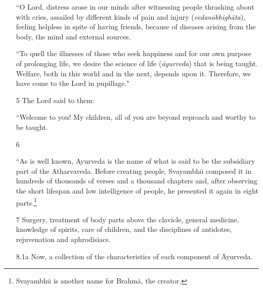 \documentclass[12pt]{article}
\newcommand{\saneng}[2]{#2 (\emph{#1})}
\newcommand{\ssaneng}[2]{\relax }
\begin{document}
\begin{itemize}
“O Lord, distress arose in our minds after witnessing people thrashing about with
cries, assailed by different kinds of \saneng{vedanābhighāta}{pain and injury}, 
feeling helpless in spite 
of having friends, because of diseases arising from the body, the mind and
external sources.


    

    \let\uncertain\texttt
    
“To quell the illnesses of those who seek happiness and for our own purpose of
prolonging life, we desire \saneng{āyurveda}{the science of life} that is being
taught.  Welfare\ssaneng{śreyas}{welfare}, both in this world and in
    the next, depends upon it. Therefore, we have come to the Lord in pupillage." %


\item[5] The Lord said to them:

“Welcome to you!  My children, all of you are beyond reproach and worthy 
to be taught.
   
    
    \item[6] 
%    
    
    “As is well known, Ayurveda is the name of what is said to be the subsidiary
part of the Atharvaveda.   Before creating people, Svayambhū composed it in
hundreds of thousands of verses and a thousand chapters and, after observing the
short lifespan and low intelligence of people, he presented it again in eight
parts.\footnote{Svayambhū is another name for Brahmā, the creator.}
    
    \item[7] Surgery, treatment of body parts above the clavicle, general medicine, 
    knowledge of spirits, care of children, and the disciplines of antidotes, rejuvenation 
    and aphrodisiacs.
        \item[8.1a] Now,  a collection of the characteristics of each component of Āyurveda.
        

\end{itemize}
\end{document}
